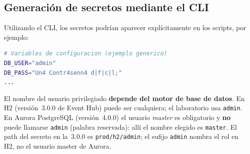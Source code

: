 \documentclass[11pt,a4paper]{article}
\begin{document}
\subsection{Generación de secretos mediante el CLI}

Utilizando el CLI, los secretos podrían aparecer explícitamente en los scripts, por ejemplo:

\begin{lstlisting}[language=bash,]
# Variables de configuracion (ejemplo generico)
DB_USER="admin"
DB_PASS="Un4 Contr4senn4 d|f|c|l;"
...
\end{lstlisting}

\vspace{1em}

El nombre del usuario privilegiado \textbf{depende del motor de base de datos}. En H2 (versión~3.0.0 de Event Hub) puede ser cualquiera; el laboratorio usa \texttt{admin}. En Aurora PostgreSQL (versión~4.0.0) el usuario \textit{master} es obligatorio y \textbf{no} puede llamarse \texttt{admin} (palabra reservada): allí el nombre elegido es \texttt{master}. El path del secreto en la~3.0.0 es \texttt{prod/h2/admin}; el sufijo \texttt{admin} nombra el rol en H2, no el usuario master de Aurora.
\end{document}
